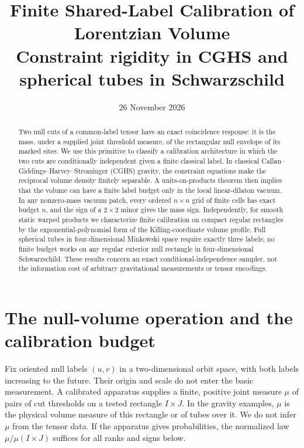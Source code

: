 \documentclass[11pt,letterpaper]{article}
\title{Finite Shared-Label Calibration of Lorentzian Volume\\[0.25em]
\large Constraint rigidity in CGHS and spherical tubes in Schwarzschild}
\author{}
\date{26 November 2026}
\begin{document}
\maketitle
\vspace{-2em}
\begin{abstract}
Two null cuts of a common-label tensor have an exact coincidence response: it is the mass, under a supplied joint threshold measure, of the rectangular null envelope of its marked sites. We use this primitive to classify a calibration architecture in which the two cuts are conditionally independent given a finite classical label. In classical Callan--Giddings--Harvey--Strominger (CGHS) gravity, the constraint equations make the reciprocal volume density finitely separable. A units-on-products theorem then implies that the volume can have a finite label budget only in the local linear-dilaton vacuum. In any nonzero-mass vacuum patch, every ordered $n\times n$ grid of finite cells has exact budget $n$, and the sign of a $2\times2$ minor gives the mass sign. Independently, for smooth static warped products we characterize finite calibration on compact regular rectangles by the exponential-polynomial form of the Killing-coordinate volume profile. Full spherical tubes in four-dimensional Minkowski space require exactly three labels; no finite budget works on any regular exterior null rectangle in four-dimensional Schwarzschild. These results concern an exact conditional-independence sampler, not the information cost of arbitrary gravitational measurements or tensor encodings.
\end{abstract}

\section{The null-volume operation and the calibration budget}

Fix oriented null labels $(u,v)$ in a two-dimensional orbit space, with both labels increasing to the future. Their origin and scale do not enter the basic measurement. A calibrated apparatus supplies a finite, positive joint measure $\mu$ of pairs of cut thresholds on a tested rectangle $I\times J$. In the gravity examples, $\mu$ is the physical volume measure of this rectangle or of tubes over it. We do not infer $\mu$ from the tensor data. If the apparatus gives probabilities, the normalized law $\mu/\mu(I\times J)$ suffices for all ranks and signs below.
\end{document}
